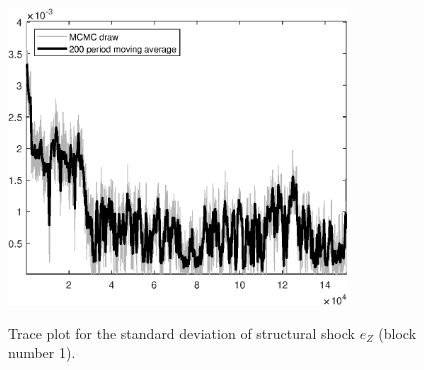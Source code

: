\begin{figure}[H]
\centering
  \includegraphics[width=0.8\textwidth]{BRS_sectoral_KK/graphs/TracePlot_SE_e_Z_blck_1}\\
    \caption{Trace plot for the standard deviation of structural shock ${e_Z}$ (block number 1).}
\end{figure}
